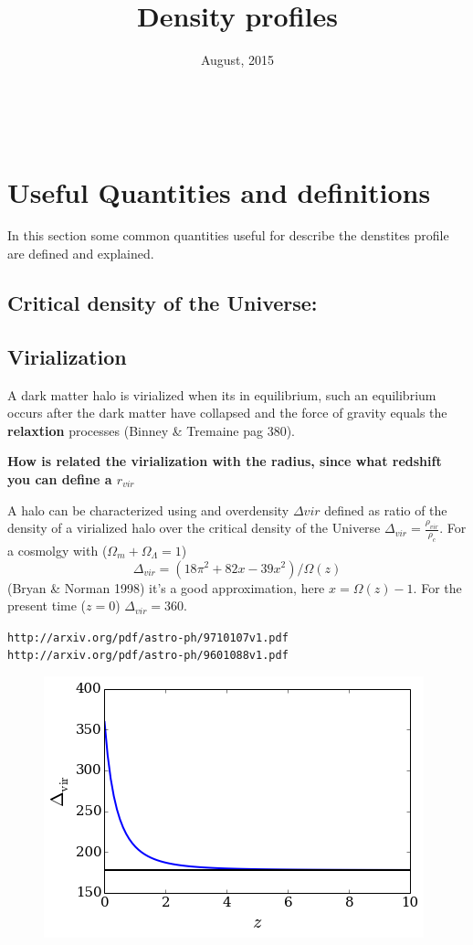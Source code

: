 \documentclass[a4paper, 12pt]{article} %
\title{\textbf{Density profiles}} %
\date{August, 2015} %
\makeatletter
\renewcommand{\maketitle}{ %
\begin{flushright} %
{\LARGE\@title} %

\vspace{50pt} %

{\large\@author} %
\\\@date %

\vspace{40pt} %
\end{flushright}
}
\makeatother
\begin{document}
\maketitle


\section{Useful Quantities and definitions}

In this section some common quantities useful for describe the denstites profile
are defined and explained.


\subsection{Critical density of the Universe:}

\subsection{Virialization}

A dark matter halo is virialized when its in equilibrium, such
an equilibrium occurs after the dark matter have collapsed and
the force of gravity equals the \textbf{relaxtion} processes
(Binney \& Tremaine pag 380).


\textbf{How is related the virialization with the radius, since what redshift 
you can define a $r_{vir}$}

A halo can be characterized using and overdensity $\Delta{vir}$
defined as ratio of the density of a virialized halo over the critical
density of the Universe $\Delta_{vir} = \frac{\rho_{vir}}{\rho_c}$.
For a cosmolgy with ($\Omega_m + \Omega_{\Lambda} = 1$)
\begin{equation}
\Delta_{vir} = (18 \pi^2 + 82x - 39x^2)/\Omega(z) 
\end{equation}
(Bryan \& Norman 1998) it's a good approximation, here $x=\Omega(z)-1$.
For the present time ($z=0$)  $\Delta_{vir}=360$.

\verb+http://arxiv.org/pdf/astro-ph/9710107v1.pdf+ \\
\verb+http://arxiv.org/pdf/astro-ph/9601088v1.pdf+


\begin{figure}[h]
\centering
\includegraphics[scale=0.7]{deltavir.png}
\end{figure}
\end{document}
